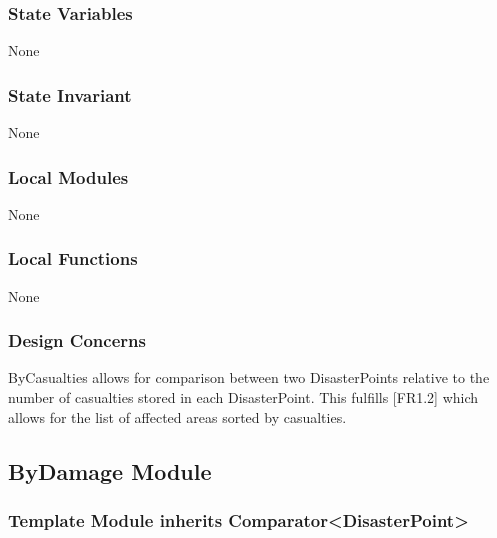 \documentclass[12pt]{article}
\begin{document}
                \subsubsection* {State Variables}

                None
                
                \subsubsection* {State Invariant}

                None
                \subsubsection* {Local Modules}
                
                None
                
                \subsubsection* {Local Functions}
                
                None

                \subsubsection* {Design Concerns}

                ByCasualties allows for comparison between two DisasterPoints relative to the number of casualties stored in each DisasterPoint. This fulfills [FR1.2] which allows for the list of affected areas sorted by casualties.

                \newpage
                \subsection* {ByDamage Module}
                
                \subsubsection*{Template Module inherits Comparator<DisasterPoint>}
                
\end{document}
